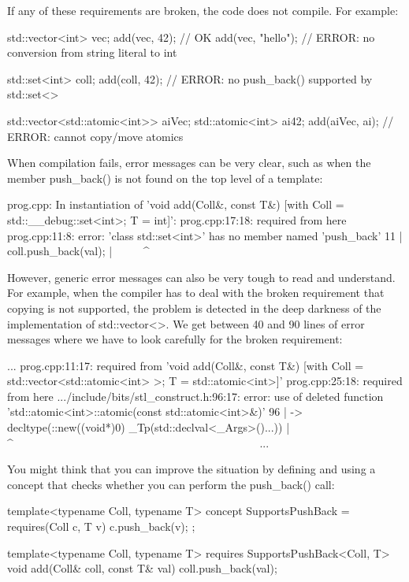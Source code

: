 If any of these requirements are broken, the code does not compile. For example:


\begin{cpp}
std::vector<int> vec;
add(vec, 42); // OK
add(vec, "hello"); // ERROR: no conversion from string literal to int

std::set<int> coll;
add(coll, 42); // ERROR: no push_back() supported by std::set<>

std::vector<std::atomic<int>> aiVec;
std::atomic<int> ai{42};
add(aiVec, ai); // ERROR: cannot copy/move atomics
\end{cpp}


When compilation fails, error messages can be very clear, such as when the member push\_back() is not found on the top level of a template:

{\footnotesize
\begin{shell}
prog.cpp: In instantiation of ’void add(Coll&, const T&)
             [with Coll = std::__debug::set<int>; T = int]’:
prog.cpp:17:18:     required from here
prog.cpp:11:8: error: ’class std::set<int>’ has no member named ’push_back’
  11 | coll.push_back(val);
      | ~~~~~^~~~~~~~~
\end{shell}
}

However, generic error messages can also be very tough to read and understand. For example, when the compiler has to deal with the broken requirement that copying is not supported, the problem is detected in the deep darkness of the implementation of std::vector<>. We get between 40 and 90 lines of error messages where we have to look carefully for the broken requirement:

{\footnotesize
\begin{shell}
...
prog.cpp:11:17: required from ’void add(Coll&, const T&)
                    [with Coll = std::vector<std::atomic<int> >; T = std::atomic<int>]’
prog.cpp:25:18:     required from here
.../include/bits/stl_construct.h:96:17:
    error: use of deleted function
’std::atomic<int>::atomic(const std::atomic<int>&)’
    96 | -> decltype(::new((void*)0) _Tp(std::declval<_Args>()...))
        |                  ^~~~~~~~~~~~~~~~~~~~~~~~~~~~~~~~~~~~~~~~~~~~~
...
\end{shell}
}


You might think that you can improve the situation by defining and using a concept that checks whether you can perform the push\_back() call:

\begin{cpp}
template<typename Coll, typename T>
concept SupportsPushBack = requires(Coll c, T v) {
	c.push_back(v);
};

template<typename Coll, typename T>
requires SupportsPushBack<Coll, T>
void add(Coll& coll, const T& val)
{
	coll.push_back(val);
}
\end{cpp}


